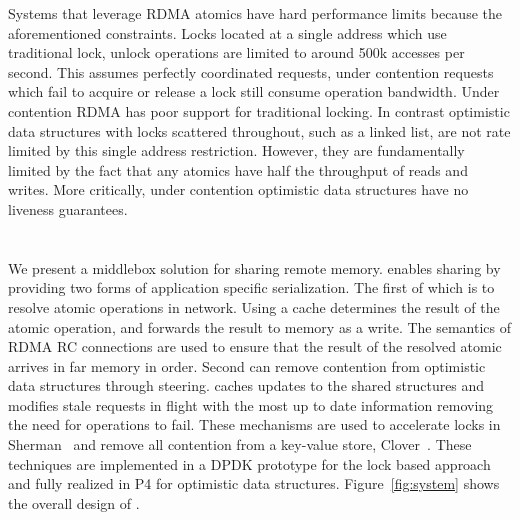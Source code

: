 Systems that leverage RDMA atomics have hard performance
limits because the aforementioned constraints.  Locks
located at a single address which use traditional lock,
unlock operations are limited to around 500k accesses per
second. This assumes perfectly coordinated requests, under
contention requests which fail to acquire or release a lock
still consume operation bandwidth.
Under contention RDMA has poor support for traditional
locking. In contrast optimistic data structures with locks
scattered throughout, such as a linked list, are not rate
limited by this single address restriction.  However, they
are fundamentally limited by the fact that any atomics have
half the throughput of reads and writes. More critically,
under contention optimistic data structures have no liveness
guarantees.





\section{\sword}

We present {\sword} a middlebox solution for sharing remote
memory. {\sword} enables sharing by providing two forms of
application specific serialization. The first of which is to
resolve atomic operations in network. Using a cache \sword
determines the result of the atomic operation, and forwards
the result to memory as a write. The semantics of RDMA RC
connections are used to ensure that the result of the
resolved atomic arrives in far memory in order. Second
{\sword} can remove contention from optimistic data
structures through steering. \sword caches updates to the
shared structures and modifies stale requests in flight with
the most up to date information removing the need for
operations to fail. These mechanisms are used to accelerate
locks in Sherman~\cite{sherman} and remove all contention
from a key-value store, Clover~\cite{clover}.
These
techniques are implemented in a DPDK prototype for the lock
based approach and fully realized in P4 for optimistic data
structures. Figure~\ref{fig:system} shows the overall design
of {\sword}.


